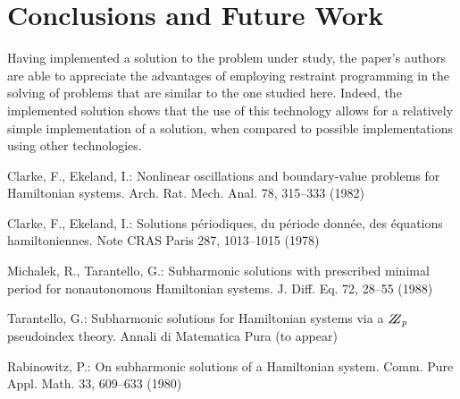 \documentclass{llncs}
\begin{document}
 \section{Conclusions and Future Work}
 Having implemented a solution to the problem under study, the paper's authors are able to appreciate the advantages of employing restraint programming in the solving of problems that are similar to the one studied here. Indeed, the implemented solution shows that the use of this technology allows for a relatively simple implementation of a solution, when compared to possible implementations using other technologies.
 
%
%
\begin{thebibliography}{5}
%
Clarke, F., Ekeland, I.:
Nonlinear oscillations and
boundary-value problems for Hamiltonian systems.
Arch. Rat. Mech. Anal. 78, 315--333 (1982)

Clarke, F., Ekeland, I.:
Solutions p\'{e}riodiques, du
p\'{e}riode donn\'{e}e, des \'{e}quations hamiltoniennes.
Note CRAS Paris 287, 1013--1015 (1978)

Michalek, R., Tarantello, G.:
Subharmonic solutions with prescribed minimal
period for nonautonomous Hamiltonian systems.
J. Diff. Eq. 72, 28--55 (1988)

Tarantello, G.:
Subharmonic solutions for Hamiltonian
systems via a $\bbbz_{p}$ pseudoindex theory.
Annali di Matematica Pura (to appear)

Rabinowitz, P.:
On subharmonic solutions of a Hamiltonian system.
Comm. Pure Appl. Math. 33, 609--633 (1980)

\end{thebibliography}
\end{document}
